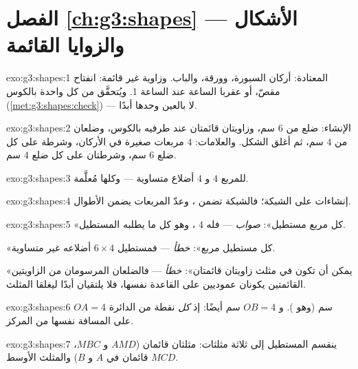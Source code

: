 \section*{الفصل \ref{ch:g3:shapes} --- الأشكال والزوايا القائمة}

\begin{solution}{exo:g3:shapes:1}
 المعتادة: أركان السبورة، وورقة، والباب.
وزاوية غير قائمة: انفتاح مقصّ، أو عقربا الساعة عند الساعة 1.
ويُتحقَّق من كل واحدة بالكوس
(\cref{met:g3:shapes:check}) --- لا بالعين وحدها أبدًا.
\end{solution}

\begin{solution}{exo:g3:shapes:2}
الإنشاء: ضلع من $6$ سم، وزاويتان قائمتان عند طرفيه بالكوس،
وضلعان من $4$ سم، ثم أغلق الشكل. والعلامات: $4$ مربعات
صغيرة في الأركان، وشرطة على كل ضلع $6$ سم، وشرطتان
على كل ضلع $4$ سم.
\end{solution}

\begin{solution}{exo:g3:shapes:3}
للمربع $4$  و $4$ أضلاع متساوية --- وكلها مُعلَّمة.
\end{solution}

\begin{solution}{exo:g3:shapes:4}
إنشاءات على الشبكة؛ فالشبكة تضمن ، وعدّ
المربعات يضمن الأطوال.
\end{solution}

\begin{solution}{exo:g3:shapes:5}
«كل مربع مستطيل»: \emph{صواب} --- فله $4$ ، وهو كل ما يطلبه المستطيل.

«كل مستطيل مربع»: \emph{خطأ} --- فمستطيل $6 \times 4$
أضلاعه غير متساوية.

«يمكن أن تكون في مثلث زاويتان قائمتان»: \emph{خطأ} ---
فالضلعان المرسومان من الزاويتين القائمتين يكونان عموديين على
القاعدة نفسها، فلا يلتقيان أبدًا ليغلقا المثلث.
\end{solution}

\begin{solution}{exo:g3:shapes:6}
$OA = 4$ سم (وهو ). و $OB = 4$ سم أيضًا:
إذ \emph{كل} نقطة من الدائرة على المسافة نفسها من المركز.
\end{solution}

\begin{solution}{exo:g3:shapes:7}
ينقسم المستطيل إلى ثلاثة مثلثات: مثلثان قائمان
($AMD$ و $MBC$، قائمان في $A$ و $B$) والمثلث
الأوسط $MCD$.
\end{solution}

